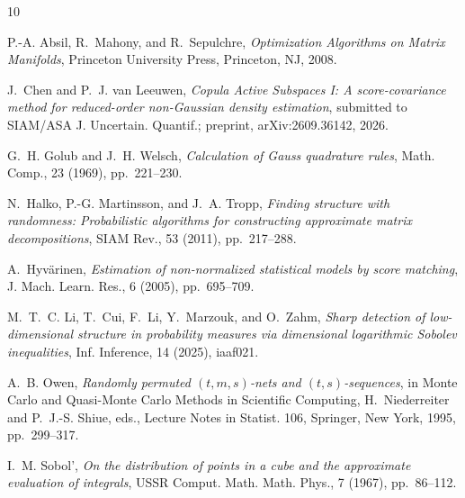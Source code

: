 \begin{thebibliography}{10}

{\sc P.-A. Absil, R.~Mahony, and R.~Sepulchre}, {\em Optimization Algorithms on Matrix Manifolds}, Princeton University Press, Princeton, NJ, 2008.

{\sc J.~Chen and P.~J. van Leeuwen}, {\em Copula Active Subspaces I: A score-covariance method for reduced-order non-{G}aussian density estimation}, submitted to SIAM/ASA J. Uncertain. Quantif.; preprint, arXiv:2609.36142, 2026.

{\sc G.~H. Golub and J.~H. Welsch}, {\em Calculation of {G}auss quadrature rules}, Math. Comp., 23 (1969), pp.~221--230.

{\sc N.~Halko, P.-G. Martinsson, and J.~A. Tropp}, {\em Finding structure with randomness: Probabilistic algorithms for constructing approximate matrix decompositions}, SIAM Rev., 53 (2011), pp.~217--288.

{\sc A.~Hyv\"arinen}, {\em Estimation of non-normalized statistical models by score matching}, J. Mach. Learn. Res., 6 (2005), pp.~695--709.

{\sc M.~T.~C. Li, T.~Cui, F.~Li, Y.~Marzouk, and O.~Zahm}, {\em Sharp detection of low-dimensional structure in probability measures via dimensional logarithmic {S}obolev inequalities}, Inf. Inference, 14 (2025), iaaf021.

{\sc A.~B. Owen}, {\em Randomly permuted $(t,m,s)$-nets and $(t,s)$-sequences}, in Monte Carlo and Quasi-Monte Carlo Methods in Scientific Computing, H.~Niederreiter and P.~J.-S. Shiue, eds., Lecture Notes in Statist. 106, Springer, New York, 1995, pp.~299--317.

{\sc I.~M. Sobol'}, {\em On the distribution of points in a cube and the approximate evaluation of integrals}, USSR Comput. Math. Math. Phys., 7 (1967), pp.~86--112.

\end{thebibliography}

